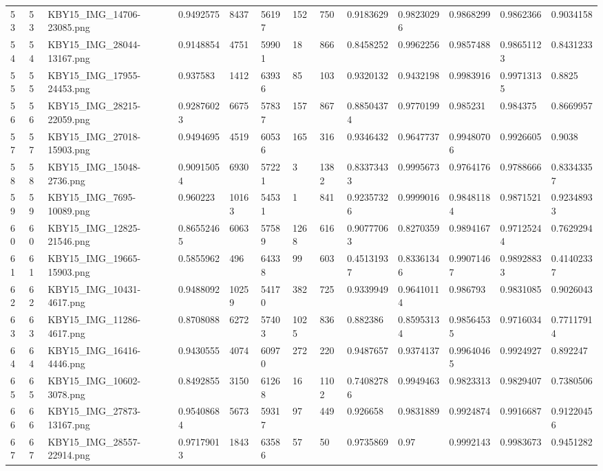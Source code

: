 \documentclass[11pt, a4paper, twoside]{report}
\begin{document}
\begin{longtable}[c]{@{}lllllllllllll@{}}
53 & 53 & KBY15\_IMG\_14706-23085.png & 0.9492575 & 8437 & 56197 & 152 & 750 & 0.9183629 & 0.98230296 & 0.9868299 & 0.9862366 & 0.9034158 \\
54 & 54 & KBY15\_IMG\_28044-13167.png & 0.9148854 & 4751 & 59901 & 18 & 866 & 0.8458252 & 0.9962256 & 0.9857488 & 0.98651123 & 0.8431233 \\
55 & 55 & KBY15\_IMG\_17955-24453.png & 0.937583 & 1412 & 63936 & 85 & 103 & 0.9320132 & 0.9432198 & 0.9983916 & 0.99713135 & 0.8825 \\
56 & 56 & KBY15\_IMG\_28215-22059.png & 0.92876023 & 6675 & 57837 & 157 & 867 & 0.88504374 & 0.9770199 & 0.985231 & 0.984375 & 0.8669957 \\
57 & 57 & KBY15\_IMG\_27018-15903.png & 0.9494695 & 4519 & 60536 & 165 & 316 & 0.9346432 & 0.9647737 & 0.99480706 & 0.9926605 & 0.9038 \\
58 & 58 & KBY15\_IMG\_15048-2736.png & 0.90915054 & 6930 & 57221 & 3 & 1382 & 0.83373433 & 0.9995673 & 0.9764176 & 0.9788666 & 0.83343357 \\
59 & 59 & KBY15\_IMG\_7695-10089.png & 0.960223 & 10163 & 54531 & 1 & 841 & 0.92357326 & 0.9999016 & 0.98481184 & 0.9871521 & 0.92348933 \\
60 & 60 & KBY15\_IMG\_12825-21546.png & 0.86552465 & 6063 & 57589 & 1268 & 616 & 0.90777063 & 0.8270359 & 0.9894167 & 0.97125244 & 0.7629294 \\
61 & 61 & KBY15\_IMG\_19665-15903.png & 0.5855962 & 496 & 64338 & 99 & 603 & 0.45131937 & 0.83361346 & 0.99071467 & 0.98928833 & 0.41402337 \\
62 & 62 & KBY15\_IMG\_10431-4617.png & 0.9488092 & 10259 & 54170 & 382 & 725 & 0.9339949 & 0.96410114 & 0.986793 & 0.9831085 & 0.9026043 \\
63 & 63 & KBY15\_IMG\_11286-4617.png & 0.8708088 & 6272 & 57403 & 1025 & 836 & 0.882386 & 0.85953134 & 0.98564535 & 0.9716034 & 0.77117914 \\
64 & 64 & KBY15\_IMG\_16416-4446.png & 0.9430555 & 4074 & 60970 & 272 & 220 & 0.9487657 & 0.9374137 & 0.99640465 & 0.9924927 & 0.892247 \\
65 & 65 & KBY15\_IMG\_10602-3078.png & 0.8492855 & 3150 & 61268 & 16 & 1102 & 0.74082786 & 0.9949463 & 0.9823313 & 0.9829407 & 0.7380506 \\
66 & 66 & KBY15\_IMG\_27873-13167.png & 0.95408684 & 5673 & 59317 & 97 & 449 & 0.926658 & 0.9831889 & 0.9924874 & 0.9916687 & 0.91220456 \\
67 & 67 & KBY15\_IMG\_28557-22914.png & 0.97179013 & 1843 & 63586 & 57 & 50 & 0.9735869 & 0.97 & 0.9992143 & 0.9983673 & 0.9451282 \\

\end{longtable}
\end{document}
